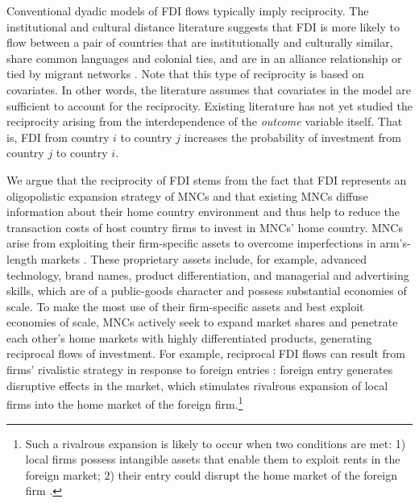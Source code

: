 \documentclass[reqno,onecolumn,letterpaper,12pt]{article}
\begin{document}
Conventional dyadic models of FDI flows typically imply reciprocity. The institutional and cultural distance literature suggests that FDI is more likely to flow between a pair of countries that are institutionally and culturally similar, share common languages and colonial ties, and are in an alliance relationship or tied by migrant networks \citep[e.g.,][]{Eden_Miller:2004,Leblang:2010,Li_Vashchilko:2010,Beazer_Blake:2018}.
Note that this type of reciprocity is based on covariates. In other words, the literature assumes that covariates in the model are sufficient to account for the reciprocity. Existing literature has not yet studied the reciprocity arising from the interdependence of the \textit{outcome} variable itself. That is, FDI from country $i$ to country $j$ increases the probability of investment from country $j$ to country $i$.

We argue that the reciprocity of FDI stems from the fact that FDI represents an oligopolistic expansion strategy of MNCs \citep{Hymer:1976,Kindleberger:1969} and that existing MNCs diffuse information about their home country environment and thus help to reduce the transaction costs of host country firms to invest in MNCs' home country. MNCs arise from exploiting their firm-specific assets to overcome imperfections in arm's-length markets \citep{Caves:1996,Dunning:1992}. These proprietary assets include, for example, advanced technology, brand names, product differentiation, and managerial and advertising skills, which are of a public-goods character and possess substantial economies of scale. To make the most use of their firm-specific assets and best exploit economies of scale, MNCs actively seek to expand market shares and penetrate each other's home markets with highly differentiated products, generating reciprocal flows of investment. For example, reciprocal FDI flows can result from firms' rivalistic strategy in response to foreign entries \citep{Graham:1978}: foreign entry generates disruptive effects in the market, which stimulates rivalrous expansion of local firms into the home market of the foreign firm.\footnote{Such a rivalrous expansion is likely to occur when two conditions are met: 1) local firms possess intangible assets that enable them to exploit rents in the foreign market; 2) their entry could disrupt the home market of the foreign firm \citep{Graham:1978}.}
\end{document}
